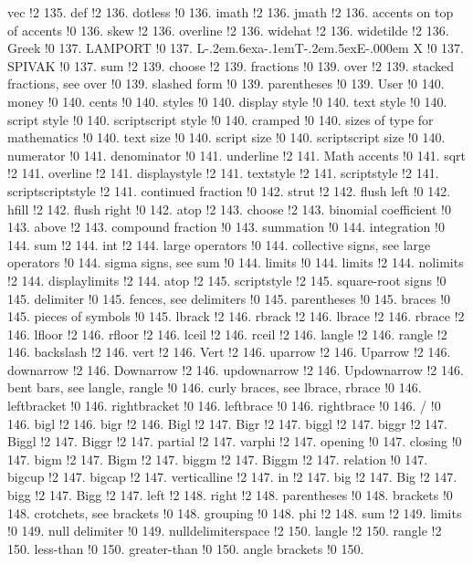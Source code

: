 vec !2 135.
def !2 136.
dotless !0 136.
imath !2 136.
jmath !2 136.
accents on top of accents !0 136.
skew !2 136.
overline !2 136.
widehat !2 136.
widetilde !2 136.
Greek !0 137.
LAMPORT !0 137.
L\kern -.2em\raise .6ex\hbox {a}\kern -.1emT\kern -.2em\lower .5ex\hbox {E}\kern -.000em X !0 137.
SPIVAK !0 137.
sum !2 139.
choose !2 139.
fractions !0 139.
over !2 139.
stacked fractions, see over !0 139.
slashed form !0 139.
parentheses !0 139.
User !0 140.
money !0 140.
cents !0 140.
styles !0 140.
display style !0 140.
text style !0 140.
script style !0 140.
scriptscript style !0 140.
cramped !0 140.
sizes of type for mathematics !0 140.
text size !0 140.
script size !0 140.
scriptscript size !0 140.
numerator !0 141.
denominator !0 141.
underline !2 141.
Math accents !0 141.
sqrt !2 141.
overline !2 141.
displaystyle !2 141.
textstyle !2 141.
scriptstyle !2 141.
scriptscriptstyle !2 141.
continued fraction !0 142.
strut !2 142.
flush left !0 142.
hfill !2 142.
flush right !0 142.
atop !2 143.
choose !2 143.
binomial coefficient !0 143.
above !2 143.
compound fraction !0 143.
summation !0 144.
integration !0 144.
sum !2 144.
int !2 144.
large operators !0 144.
collective signs, see large operators !0 144.
sigma signs, see sum !0 144.
limits !0 144.
limits !2 144.
nolimits !2 144.
displaylimits !2 144.
atop !2 145.
scriptstyle !2 145.
square-root signs !0 145.
delimiter !0 145.
fences, see delimiters !0 145.
parentheses !0 145.
braces !0 145.
pieces of symbols !0 145.
lbrack !2 146.
rbrack !2 146.
lbrace !2 146.
rbrace !2 146.
lfloor !2 146.
rfloor !2 146.
lceil !2 146.
rceil !2 146.
langle !2 146.
rangle !2 146.
backslash !2 146.
vert !2 146.
Vert !2 146.
uparrow !2 146.
Uparrow !2 146.
downarrow !2 146.
Downarrow !2 146.
updownarrow !2 146.
Updownarrow !2 146.
bent bars, see langle, rangle !0 146.
curly braces, see lbrace, rbrace !0 146.
leftbracket !0 146.
rightbracket !0 146.
leftbrace !0 146.
rightbrace !0 146.
/ !0 146.
bigl !2 146.
bigr !2 146.
Bigl !2 147.
Bigr !2 147.
biggl !2 147.
biggr !2 147.
Biggl !2 147.
Biggr !2 147.
partial !2 147.
varphi !2 147.
opening !0 147.
closing !0 147.
bigm !2 147.
Bigm !2 147.
biggm !2 147.
Biggm !2 147.
relation !0 147.
bigcup !2 147.
bigcap !2 147.
verticalline !2 147.
in !2 147.
big !2 147.
Big !2 147.
bigg !2 147.
Bigg !2 147.
left !2 148.
right !2 148.
parentheses !0 148.
brackets !0 148.
crotchets, see brackets !0 148.
grouping !0 148.
phi !2 148.
sum !2 149.
limits !0 149.
null delimiter !0 149.
nulldelimiterspace !2 150.
langle !2 150.
rangle !2 150.
less-than !0 150.
greater-than !0 150.
angle brackets !0 150.
